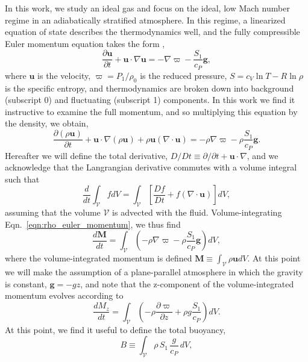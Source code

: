 \documentclass[twocolumn, amsmath, amsfonts, amssymb, trackchanges]{aastex62}
\newcommand{\DivU}{\ensuremath{\nabla\cdot\bm{u}}}
\newcommand{\grad}{\ensuremath{\nabla}}
\begin{document}
In this work, we study an ideal gas and focus on the ideal, low Mach number regime in an adiabatically stratified atmosphere. 
In this regime, a linearized equation of state describes the thermodynamics well, and the fully compressible Euler momentum equation takes the form \citep{brown&all2012},
\begin{equation}
\frac{\partial \bm{u}}{\partial t} + \bm{u}\cdot\grad\bm{u} = 
-\grad\varpi - \frac{S_1}{c_P}\bm{g},
\label{eqn:euler_momentum}
\end{equation}
where $\bm{u}$ is the velocity, $\varpi = P_1 / \rho_0$ is the reduced pressure, $S = c_V\ln T - R\ln\rho$ is the specific entropy, and thermodynamics are broken down into background (subscript 0) and fluctuating (subscript 1) components.
In this work we find it instructive to examine the full momentum, and so multiplying this equation by the density, we obtain,
\begin{equation}
\frac{\partial (\rho\bm{u})}{\partial t} + \bm{u}\cdot\grad(\rho\bm{u}) + \rho\bm{u}(\DivU)
= -\rho\grad\varpi - \rho\frac{S_1}{c_P}\bm{g}.
\label{eqn:rho_euler_momentum}
\end{equation}
Hereafter we will define the total derivative, $D/Dt \equiv \partial/\partial t + \bm{u}\cdot\grad$, and we acknowledge that the Langrangian derivative commutes with a volume integral such that
\begin{equation*}
\frac{d}{dt}\int_{\mathcal{V}} f dV = \int_{\mathcal{V}} \left[\frac{Df}{Dt} + f(\DivU)\right]dV,
\end{equation*}
assuming that the volume $\mathcal{V}$ is advected with the fluid.
Volume-integrating Eqn.~\ref{eqn:rho_euler_momentum}, we thus find
\begin{equation}
\frac{d\bm{M}}{dt} = \int_{\mathcal{V}}\left(-\rho\grad\varpi - \rho\frac{S_1}{c_P}\bm{g}\right)dV,
\label{eqn:int_momentum_eqn}
\end{equation}
where the volume-integrated momentum is defined $\bm{M} \equiv \int_{\mathcal{V}}\rho\bm{u} dV$.
At this point we will make the assumption of a plane-parallel atmosphere in which the gravity is constant, $\bm{g} = -g\hat{z}$, and note that the z-component of the volume-integrated momentum evolves according to
\begin{equation}
\frac{d M_z}{dt} = \int_{\mathcal{V}}\left( -\rho\frac{\partial \varpi}{\partial z} + \rho g \frac{S_1}{c_P} \right)dV.
\label{eqn:Mz_definition}
\end{equation}
At this point, we find it useful to define the total buoyancy,
\begin{equation}
B \equiv \int_{\mathcal{V}} \rho\, S_1\, \frac{g}{c_P}\, dV,
\label{eqn:tot_buoyancy}
\end{equation}
\end{document}
